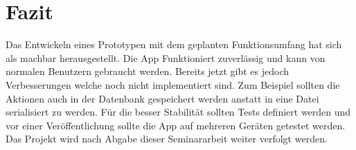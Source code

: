 \chapter{Fazit}
\label{sec:fazit}
Das Entwickeln eines Prototypen mit dem geplanten Funktionsumfang hat sich als machbar herausgestellt. Die App Funktioniert zuverlässig und kann von normalen Benutzern gebraucht werden. Bereits jetzt gibt es jedoch Verbesserungen welche noch nicht implementiert sind. Zum Beispiel sollten die Aktionen auch in der Datenbank gespeichert werden anstatt in eine Datei serialisiert zu werden. Für die besser Stabilität sollten Tests definiert werden und vor einer Veröffentlichung sollte die App auf mehreren Geräten getestet werden. Das Projekt wird nach Abgabe dieser Seminararbeit weiter verfolgt werden.